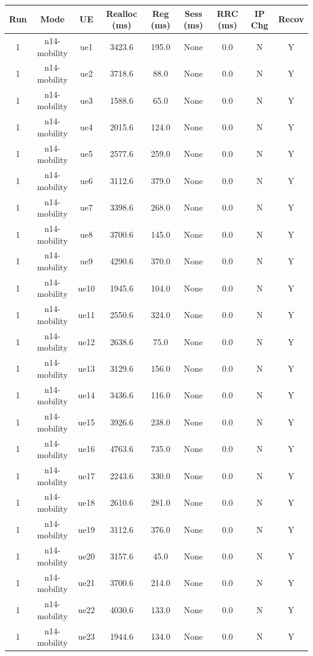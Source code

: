 \begin{table}[ht]
\centering
\begin{tabular}{|c|c|c|c|c|c|c|c|c|}
\hline
Run & Mode & UE & Realloc (ms) & Reg (ms) & Sess (ms) & RRC (ms) & IP Chg & Recov \\
\hline
1 & n14-mobility & ue1 & 3423.6 & 195.0 & None & 0.0 & N & Y \\
1 & n14-mobility & ue2 & 3718.6 & 88.0 & None & 0.0 & N & Y \\
1 & n14-mobility & ue3 & 1588.6 & 65.0 & None & 0.0 & N & Y \\
1 & n14-mobility & ue4 & 2015.6 & 124.0 & None & 0.0 & N & Y \\
1 & n14-mobility & ue5 & 2577.6 & 259.0 & None & 0.0 & N & Y \\
1 & n14-mobility & ue6 & 3112.6 & 379.0 & None & 0.0 & N & Y \\
1 & n14-mobility & ue7 & 3398.6 & 268.0 & None & 0.0 & N & Y \\
1 & n14-mobility & ue8 & 3700.6 & 145.0 & None & 0.0 & N & Y \\
1 & n14-mobility & ue9 & 4290.6 & 370.0 & None & 0.0 & N & Y \\
1 & n14-mobility & ue10 & 1945.6 & 104.0 & None & 0.0 & N & Y \\
1 & n14-mobility & ue11 & 2550.6 & 324.0 & None & 0.0 & N & Y \\
1 & n14-mobility & ue12 & 2638.6 & 75.0 & None & 0.0 & N & Y \\
1 & n14-mobility & ue13 & 3129.6 & 156.0 & None & 0.0 & N & Y \\
1 & n14-mobility & ue14 & 3436.6 & 116.0 & None & 0.0 & N & Y \\
1 & n14-mobility & ue15 & 3926.6 & 238.0 & None & 0.0 & N & Y \\
1 & n14-mobility & ue16 & 4763.6 & 735.0 & None & 0.0 & N & Y \\
1 & n14-mobility & ue17 & 2243.6 & 330.0 & None & 0.0 & N & Y \\
1 & n14-mobility & ue18 & 2610.6 & 281.0 & None & 0.0 & N & Y \\
1 & n14-mobility & ue19 & 3112.6 & 376.0 & None & 0.0 & N & Y \\
1 & n14-mobility & ue20 & 3157.6 & 45.0 & None & 0.0 & N & Y \\
1 & n14-mobility & ue21 & 3700.6 & 214.0 & None & 0.0 & N & Y \\
1 & n14-mobility & ue22 & 4030.6 & 133.0 & None & 0.0 & N & Y \\
1 & n14-mobility & ue23 & 1944.6 & 134.0 & None & 0.0 & N & Y \\

\end{tabular}
\end{table}
